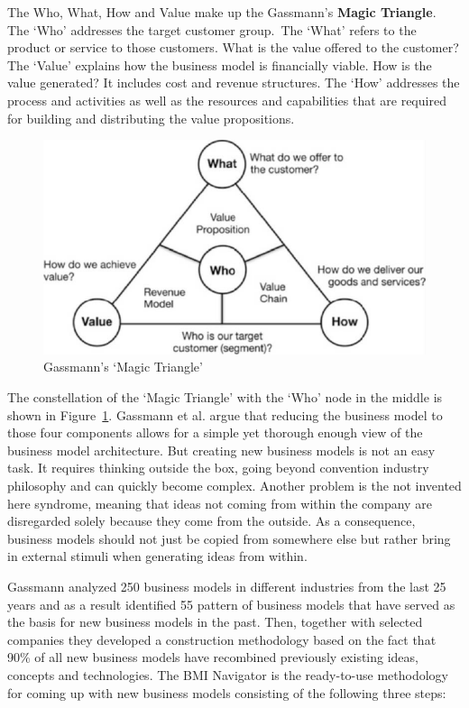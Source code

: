 		The Who, What, How and Value make up the Gassmann's \textbf{Magic Triangle}. The `Who' addresses the target customer group.~The `What' refers to the product or service to those customers. What is the value offered to the customer? The `Value' explains how the business model is financially viable. How is the value generated? It includes cost and revenue structures. The `How' addresses the process and activities as well as the resources and capabilities that are required for building and distributing the value propositions.		
		\vspace{15mm}
		\begin{figure}[ht]
		    \begin{center}
		    \includegraphics[scale=1.0]{Talk11/gassmann_triangle.pdf}
		    \end{center}
		    \caption{Gassmann's `Magic Triangle' \cite[p.~91]{gassmann55}}
		    \label{fig:m_triangle}
		\end{figure}
 		\vspace{15mm}
		The constellation of the `Magic Triangle' with the `Who' node in the middle is shown in Figure~\ref{fig:m_triangle}. Gassmann et al. argue that reducing the business model to those four components allows for a simple yet thorough enough view of the business model architecture. But creating new business models is not an easy task. It requires thinking outside the box, going beyond convention industry philosophy and can quickly become complex. Another problem is the not invented here syndrome, meaning that ideas not coming from within the company are disregarded solely because they come from the outside. As a consequence, business models should not just be copied from somewhere else but rather bring in external stimuli when generating ideas from within.

		Gassmann analyzed 250 business models in different industries from the last 25 years and as a result identified 55 pattern of business models that have served as the basis for new business models in the past. Then, together with selected companies they developed a construction methodology based on the fact that 90\% of all new business models have recombined previously existing ideas, concepts and  technologies. The BMI Navigator is the ready-to-use methodology for coming up with new business models consisting of the following three steps:

